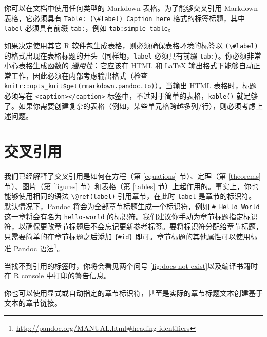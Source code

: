 \documentclass[
  12pt,
]{krantz}
\renewcommand{\href}[2]{#2\footnote{\url{#1}}}
\theoremstyle{definition}
\theoremstyle{definition}
\theoremstyle{definition}
\theoremstyle{definition}
\theoremstyle{remark}
\begin{document}
你可以在文档中使用任何类型的 Markdown 表格。为了能够交叉引用 Markdown 表格，它必须具有 \texttt{Table:\ (\textbackslash{}\#label)\ Caption\ here} 格式的标签标题，其中 \texttt{label} 必须具有前缀 \texttt{tab:}，例如 \texttt{tab:simple-table}。

如果决定使用其它 R 软件包生成表格，则必须确保表格环境的标签以 \texttt{(\textbackslash{}\#label)} 的格式出现在表格标题的开头（同样地，\texttt{label} 必须具有前缀 \texttt{tab:}）。你必须非常小心表格生成函数的 \emph{通用性}：它应该在 HTML 和 LaTeX 输出格式下能够自动正常工作，因此必须在内部考虑输出格式（检查 \texttt{knitr::opts\_knit\$get(\textquotesingle{}rmarkdown.pandoc.to\textquotesingle{})}）。当输出 HTML 表格时，标题必须写在 \texttt{\textless{}caption\textgreater{}\textless{}/caption\textgreater{}} 标签中，不过对于简单的表格，\texttt{kable()} 就足够了。如果你需要创建复杂的表格（例如，某些单元格跨越多列/行），则必须考虑上述问题。

\hypertarget{cross-references}{%
\section{交叉引用}\label{cross-references}}

我们已经解释了交叉引用是如何在方程（第 \ref{equations} 节）、定理（第 \ref{theorems} 节）、图片（第 \ref{figures} 节）和表格（第 \ref{tables} 节）上起作用的。事实上，你也能够使用相同的语法 \texttt{\textbackslash{}@ref(label)} 引用章节，在此时 \texttt{label} 是章节的标识符。默认情况下，Pandoc 将会为全部章节标题生成一个标识符，例如 \texttt{\#\ Hello\ World} 这一章将会有名为 \texttt{hello-world} 的标识符。我们建议你手动为章节标题指定标识符，以确保更改章节标题后不会忘记更新参考标签。要将标识符分配给章节标题，只需要简单的在章节标题之后添加 \texttt{\{\#id\}} 即可。章节标题的其他属性可以使用标准 \href{http://pandoc.org/MANUAL.html\#heading-identifiers}{Pandoc 语法}。

当找不到引用的标签时，你将会看见两个问号 \ref{fig:does-not-exist}以及编译书籍时在 R console 中打印的警告信息。

你也可以使用显式或自动指定的章节标识符，甚至是实际的章节标题文本创建基于文本的章节链接。
\end{document}
